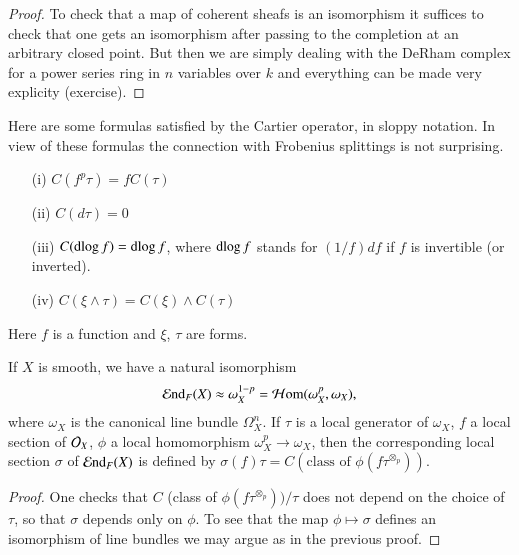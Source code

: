 \begin{proof}
To check that a map of coherent sheafs is an isomorphism it suffices
to check that one gets an isomorphism after passing to the completion
at an arbitrary closed point. But then we are simply dealing with the
DeRham complex for a power series ring in $n$ variables over $k$ and
everything can be made very explicity (exercise).
\end{proof}

\begin{remark}\label{rem-A.3.4}
Here are some formulas satisfied by the Cartier operator, in sloppy
notation. In view of these formulas the connection with Frobenius
splittings is not surprising.
\begin{itemize}
\item[(i)] $C(f^{p}\tau)=fC(\tau)$\pageoriginale

\item[(ii)] $C(d\tau)=0$\label{page84}

\item[(iii)] $C(\operatorname{dlog} f)=\operatorname{dlog} f$, where $\operatorname{dlog} f$ stands for
  $(1/f)df$ if $f$ is invertible (or inverted).

\item[(iv)] $C(\xi\wedge \tau)=C(\xi)\wedge C(\tau)$
\end{itemize}

Here $f$ is a function and $\xi$, $\tau$ are forms.
\end{remark}

\begin{proposition}\label{prop-A.3.5}
If $X$ is smooth, we have a natural isomorphism
$$
\operatorname{\mathcal{E}nd}_{F}(X)\approx \omega^{1-p}_{X}=\operatorname{\mathcal{H}om}(\omega^{p}_{X},\omega_{X}),
$$
where $\omega_{X}$ is the canonical line bundle $\Omega^{n}_{X}$. If
$\tau$ is a local generator of $\omega_{X}$, $f$ a local section of
$\mathcal{O}_{X}$, $\phi$ a local homomorphism $\omega^{p}_{X}\to \omega_{X}$,
then the corresponding local section $\sigma$ of $\operatorname{\mathcal{E}nd}_{F}(X)$ is
defined by $\sigma(f)\tau=C(\text{class of~}
\phi(f\tau^{\otimes_{p}}))$. 
\end{proposition}

\begin{proof}
One checks that $C$ (class of $\phi(f\tau^{\otimes_{p}}))/\tau$ does
not depend on the choice of $\tau$, so that $\sigma$ depends only on
$\phi$. To see that the map $\phi\mapsto \sigma$ defines an
isomorphism of line bundles we may argue as in the previous proof.
\end{proof}

